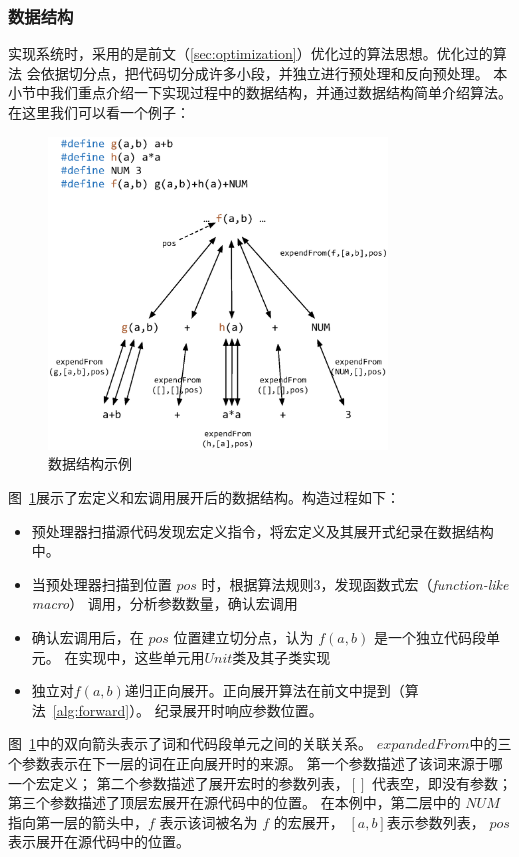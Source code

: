 \subsubsection{数据结构}\label{sec:datastruct}
实现系统时，采用的是前文（\ref{sec:optimization}）优化过的算法思想。优化过的算法
会依据切分点，把代码切分成许多小段，并独立进行预处理和反向预处理。
本小节中我们重点介绍一下实现过程中的数据结构，并通过数据结构简单介绍算法。
在这里我们可以看一个例子：
\begin{figure}
\centering
\includegraphics[width=9cm]{pics/original.eps}
\caption{数据结构示例 \label{pic:datastruct}}
\end{figure}

图~\ref{pic:datastruct}展示了宏定义和宏调用展开后的数据结构。构造过程如下：
\begin{itemize}
\item 预处理器扫描源代码发现宏定义指令，将宏定义及其展开式纪录在数据结构中。
\item 当预处理器扫描到位置 $pos$ 时，根据算法规则3，发现函数式宏（\emph{function-like macro}）
  调用，分析参数数量，确认宏调用
\item 确认宏调用后，在 $pos$ 位置建立切分点，认为 $f(a, b)$ 是一个独立代码段单元。
  在实现中，这些单元用$Unit$类及其子类实现
\item 独立对$f(a, b)$递归正向展开。正向展开算法在前文中提到（算法~\ref{alg:forward}）。
  纪录展开时响应参数位置。
\end{itemize}

图~\ref{pic:datastruct}中的双向箭头表示了词和代码段单元之间的关联关系。
$expandedFrom$中的三个参数表示在下一层的词在正向展开时的来源。
第一个参数描述了该词来源于哪一个宏定义；
第二个参数描述了展开宏时的参数列表，$[]$ 代表空，即没有参数；
第三个参数描述了顶层宏展开在源代码中的位置。
在本例中，第二层中的 $NUM$ 指向第一层的箭头中，$f$ 表示该词被名为 $f$ 的宏展开，
$[a, b]$表示参数列表， $pos$表示展开在源代码中的位置。


